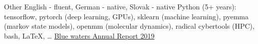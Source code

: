 
\begin{rubric}{Other}
\noentry{}
\entry*[Languages] 
 English - fluent, German - native, Slovak - native
	Python (5+ years): tensorflow, pytorch (deep learning, GPUs), sklearn (machine learning), pyemma (markov state models), openmm (molecular dynamics), radical cybertools (HPC), bash, \LaTeX, \ldots
{}
   \href{https://bluewaters.ncsa.illinois.edu/liferay-content/document-library/BW-Annual-Report-2019/jha_proteins.pdf}{Blue waters Annual Report 2019\faLink}
\end{rubric}

